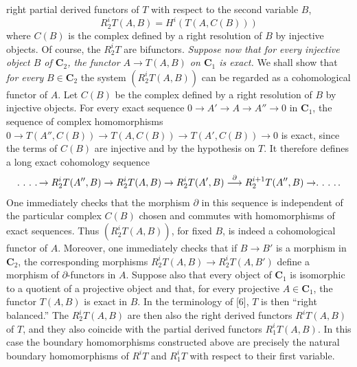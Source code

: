
\noindent right partial derived functors of $T$ with respect to the second
variable $B$,
\[
 R_2^iT(A,B)=H^i(T(A,C(B)))
\]
where $C(B)$ is the complex defined by a right resolution of $B$ by injective
objects. Of course, the $R_2^iT$ are bifunctors.
\textit{Suppose now that for every injective object $B$ of $\mathbf{C}_2$, the functor
$A\to T(A,B)$ on $\mathbf{C}_1$ is exact.} We shall show that \textit{for every}
$B\in \mathbf{C}_2$ the system $(R_2^iT(A,B))$ can be regarded as a cohomological
functor of $A$. Let $C(B)$ be the complex defined by a right resolution of
$B$ by injective objects. For every exact sequence
$0\to A'\to A\to A''\to0$
in $\mathbf{C}_1$, the sequence of complex homomorphisms
$0\to T(A'',C(B))\to T(A,C(B))
 \to T(A',C(B))\to0$
is exact, since the terms of $C(B)$ are injective and by the hypothesis on
$T$. It therefore defines a long exact cohomology sequence
\[
\ldotp\,\ldotp\,\ldotp\,\ldotp\to R_2^iT(A'',B)\to R_2^iT(A,B)
\to R_2^iT(A',B)
\mathrel{\mathop{\longrightarrow}\limits^{\partial}}R_2^{i+1}T(A'',B)
\to\ldotp\,\ldotp\,\ldotp\,\ldotp .
\]
One immediately checks that the morphism $\partial$ in this sequence is independent of the particular
complex $C(B)$ chosen and commutes with homomorphisms of exact sequences.
Thus $(R_2^iT(A,B))$, for fixed $B$, is indeed a cohomological functor of $A$.
Moreover, one immediately checks that if $B\to B'$ is a morphism in $\mathbf{C}_2$, the corresponding
morphisms $R_2^iT(A,B)\to R_2^iT(A,B')$ define a morphism of
$\partial$-functors in $A$.
Suppose also that every object of $\mathbf{C}_1$ is isomorphic to a quotient of a
projective object and that, for every projective $A\in \mathbf{C}_1$, the functor
$T(A,B)$ is exact in $B$. In the terminology of [6], $T$ is then
``right balanced.'' The $R_2^iT(A,B)$ are then also the right derived functors
$R^iT(A,B)$ of $T$, and they also coincide with the partial derived functors
$R_1^iT(A,B)$. In this case the boundary homomorphisms constructed above are
precisely the natural boundary homomorphisms of $R^iT$ and $R_1^iT$ with
respect to their first variable.

